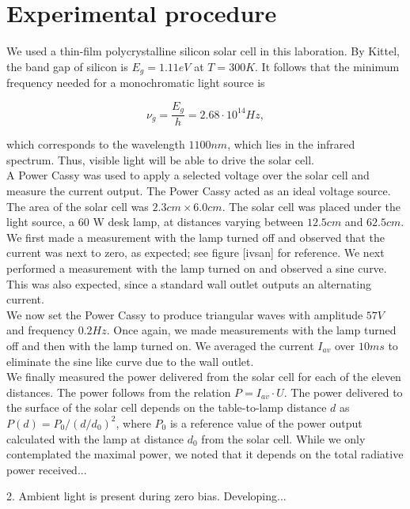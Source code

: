 \documentclass[a4paper]{article}
\begin{document}
\section{Experimental procedure}

We used a thin-film polycrystalline silicon solar cell in this laboration. By Kittel, the band gap of silicon is $E_g = 1.11 eV$ at $T = 300 K$. It follows that the minimum frequency needed for a monochromatic light source is

$$\nu_g = \frac{E_g}{h} = 2.68 \cdot 10^{14} Hz,$$

which corresponds to the wavelength $1100 nm$, which lies in the infrared spectrum. Thus, visible light will be able to drive the solar cell. \\

A Power Cassy was used to apply a selected voltage over the solar cell and measure the current output. The Power Cassy acted as an ideal voltage source. The area of the solar cell was $2.3 cm \times 6.0 cm$. The solar cell was placed under the light source, a $60$ W desk lamp, at distances varying between $12.5 cm$ and $62.5 cm$. \\

We first made a measurement with the lamp turned off and observed that the current was next to zero, as expected; see figure [ivsan] for reference. We next performed a measurement with the lamp turned on and observed a sine curve. This was also expected, since a standard wall outlet outputs an alternating current. \\

We now set the Power Cassy to produce triangular waves with amplitude $57 V$ and frequency $0.2 Hz$. Once again, we made measurements with the lamp turned off and then with the lamp turned on. We averaged the current $I_{av}$ over $10 ms$ to eliminate the sine like curve due to the wall outlet. \\

We finally measured the power delivered from the solar cell for each of the eleven distances. The power follows from the relation $P = I_{av} \cdot U$. The power delivered to the surface of the solar cell depends on the table-to-lamp distance $d$ as $P(d) = P_0/(d/d_0)^2$, where $P_0$ is a reference value of the power output calculated with the lamp at distance $d_0$ from the solar cell. While we only contemplated the maximal power, we noted that it depends on the total radiative power received...

2. Ambient light is present during zero bias. Developing...
\end{document}
